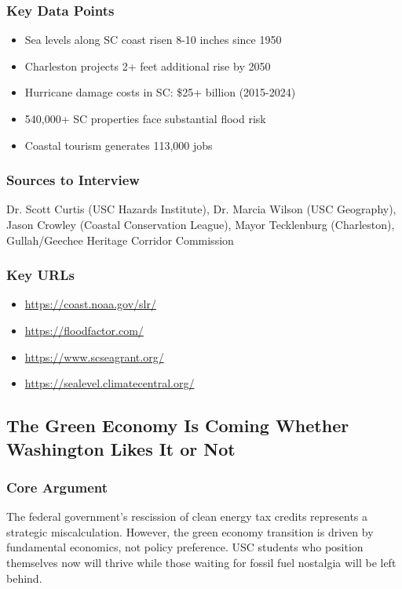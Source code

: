\documentclass[11pt,letterpaper]{article}
\begin{document}
\subsubsection*{Key Data Points}
\begin{itemize}[noitemsep]
    \item Sea levels along SC coast risen 8-10 inches since 1950
    \item Charleston projects 2+ feet additional rise by 2050
    \item Hurricane damage costs in SC: \$25+ billion (2015-2024)
    \item 540,000+ SC properties face substantial flood risk
    \item Coastal tourism generates 113,000 jobs
\end{itemize}

\subsubsection*{Sources to Interview}
Dr. Scott Curtis (USC Hazards Institute), Dr. Marcia Wilson (USC Geography), Jason Crowley (Coastal Conservation League), Mayor Tecklenburg (Charleston), Gullah/Geechee Heritage Corridor Commission

\subsubsection*{Key URLs}
\begin{itemize}[noitemsep]
    \item \url{https://coast.noaa.gov/slr/}
    \item \url{https://floodfactor.com/}
    \item \url{https://www.scseagrant.org/}
    \item \url{https://sealevel.climatecentral.org/}
\end{itemize}

\newpage
\subsection{The Green Economy Is Coming Whether Washington Likes It or Not}

\subsubsection*{Core Argument}
The federal government's rescission of clean energy tax credits represents a strategic miscalculation. However, the green economy transition is driven by fundamental economics, not policy preference. USC students who position themselves now will thrive while those waiting for fossil fuel nostalgia will be left behind.
\end{document}
